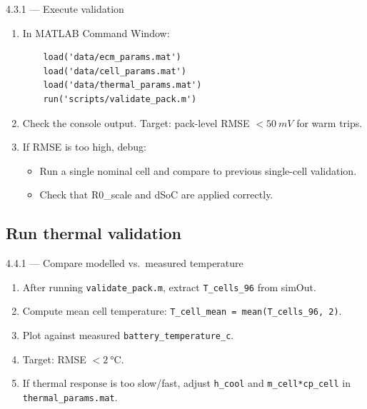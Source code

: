 \documentclass[11pt,a4paper]{article}
\begin{document}
\begin{guistep}{4.3.1 — Execute validation}
\begin{enumerate}
    \item In MATLAB Command Window:
    \begin{verbatim}
    load('data/ecm_params.mat')
    load('data/cell_params.mat')
    load('data/thermal_params.mat')
    run('scripts/validate_pack.m')
    \end{verbatim}
    \item Check the console output. Target: pack-level RMSE $< \SI{50}{mV}$ for warm trips.
    \item If RMSE is too high, debug:
    \begin{itemize}
        \item Run a single nominal cell and compare to previous single-cell validation.
        \item Check that R0\_scale and dSoC are applied correctly.
    \end{itemize}
\end{enumerate}
\end{guistep}

\subsection{Run thermal validation}

\begin{guistep}{4.4.1 — Compare modelled vs.\ measured temperature}
\begin{enumerate}
    \item After running \texttt{validate\_pack.m}, extract \texttt{T\_cells\_96} from simOut.
    \item Compute mean cell temperature: \texttt{T\_cell\_mean = mean(T\_cells\_96, 2)}.
    \item Plot against measured \texttt{battery\_temperature\_c}.
    \item Target: RMSE $< \SI{2}{\degreeCelsius}$.
    \item If thermal response is too slow/fast, adjust \texttt{h\_cool} and \texttt{m\_cell*cp\_cell} in \texttt{thermal\_params.mat}.
\end{enumerate}
\end{guistep}

\end{document}
